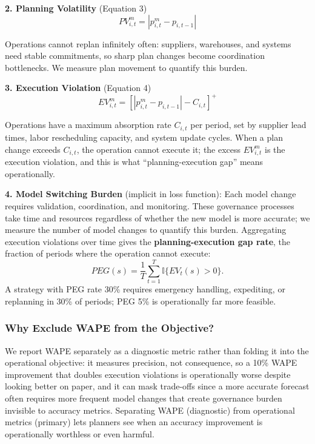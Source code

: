 \textbf{2. Planning Volatility} (Equation 3)
\begin{equation}
PV_{i,t}^{m}=|p_{i,t}^{m}-p_{i,t-1}|
\end{equation}

Operations cannot replan infinitely often: suppliers, warehouses, and systems need stable commitments, so sharp plan changes become coordination bottlenecks. We measure plan movement to quantify this burden.

\textbf{3. Execution Violation} (Equation 4)
\begin{equation}
EV_{i,t}^{m}=[|p_{i,t}^{m}-p_{i,t-1}|-C_{i,t}]^{+}
\end{equation}

Operations have a maximum absorption rate $C_{i,t}$ per period, set by supplier lead times, labor rescheduling capacity, and system update cycles. When a plan change exceeds $C_{i,t}$, the operation cannot execute it; the excess $EV_{i,t}^{m}$ is the execution violation, and this is what ``planning-execution gap'' means operationally.

\textbf{4. Model Switching Burden} (implicit in loss function): Each model change requires validation, coordination, and monitoring. These governance processes take time and resources regardless of whether the new model is more accurate; we measure the number of model changes to quantify this burden. Aggregating execution violations over time gives the \textbf{planning-execution gap rate}, the fraction of periods where the operation cannot execute:
\begin{equation}
PEG(s)=\frac{1}{T}\sum_{t=1}^{T}\mathbb{I}\{EV_t(s)>0\}.
\end{equation}
A strategy with PEG rate 30\% requires emergency handling, expediting, or replanning in 30\% of periods; PEG 5\% is operationally far more feasible.

\subsubsection{Why Exclude WAPE from the Objective?}

We report WAPE separately as a diagnostic metric rather than folding it into the operational objective: it measures precision, not consequence, so a 10\% WAPE improvement that doubles execution violations is operationally worse despite looking better on paper, and it can mask trade-offs since a more accurate forecast often requires more frequent model changes that create governance burden invisible to accuracy metrics. Separating WAPE (diagnostic) from operational metrics (primary) lets planners see when an accuracy improvement is operationally worthless or even harmful.

